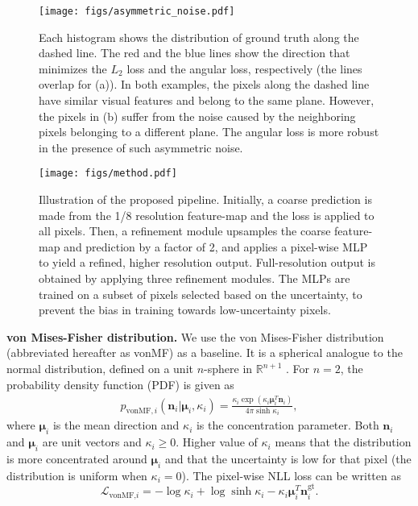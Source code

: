 \documentclass[10pt,twocolumn,letterpaper]{article}
\begin{document}
\begin{figure}[t]
\begin{center}
\texttt{[image: figs/asymmetric\_noise.pdf]}
\end{center}
\caption{Each histogram shows the distribution of ground truth along the dashed line. The red and the blue lines show the direction that minimizes the $L_2$ loss and the angular loss, respectively (the lines overlap for (a)). In both examples, the pixels along the dashed line have similar visual features and belong to the same plane. However, the pixels in (b) suffer from the noise caused by the neighboring pixels belonging to a different plane. The angular loss is more robust in the presence of such asymmetric noise.}
\label{fig:robustness_of_AL}
\end{figure}

\begin{figure*}[t]
\begin{center}
\texttt{[image: figs/method.pdf]}
\end{center}
\caption{Illustration of the proposed pipeline. Initially, a coarse prediction is made from the 1/8 resolution feature-map and the loss is applied to all pixels. Then, a refinement module upsamples the coarse feature-map and prediction by a factor of 2, and applies a pixel-wise MLP to yield a refined, higher resolution output. Full-resolution output is obtained by applying three refinement modules. The MLPs are trained on a subset of pixels selected based on the uncertainty, to prevent the bias in training towards low-uncertainty pixels.}
\label{fig:method}
\end{figure*}

\noindent
\textbf{von Mises-Fisher distribution.} We use the von Mises-Fisher distribution \cite{fisher1993statistical} (abbreviated hereafter as vonMF) as a baseline. It is a spherical analogue to the normal distribution, defined on a unit $n$-sphere in $\mathbb{R}^{n+1}$ \cite{moments_of_vMF}. For $n=2$, the probability density function (PDF) is given as
\begin{align}
    \label{eqn:vonMF-PDF}
    p_{\text{vonMF},i}(\mathbf{n}_i|\boldsymbol{\mu}_i,\kappa_i) = \frac{\kappa_i \exp(\kappa_i \boldsymbol{\mu}_i^T \mathbf{n}_i)}{4\pi \sinh \kappa_i},
\end{align}
\noindent
where $\boldsymbol{\mu}_i$ is the mean direction and $\kappa_i$ is the concentration parameter. Both $\mathbf{n}_i$ and $\boldsymbol{\mu}_i$ are unit vectors and $\kappa_i \geq 0$. Higher value of $\kappa_i$ means that the distribution is more concentrated around $\boldsymbol{\mu}_i$ and that the uncertainty is low for that pixel (the distribution is uniform when $\kappa_i=0$). The pixel-wise NLL loss can be written as
\begin{equation}
\label{eqn:vonMF-NLL}
\mathcal{L}_{\text{vonMF,}i} = -\log \kappa_{i} + \log \sinh{\kappa_i} - \kappa_i \boldsymbol{\mu}^T_{i} \mathbf{n}^{\text{gt}}_{i}.
\end{equation}
\end{document}
